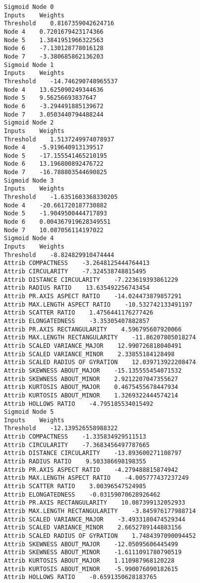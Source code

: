 \documentclass[
	article,			%
	11pt,				%
	oneside,			%
	a4paper,			%
	english,			%
	brazil,				%
	sumario=tradicional
	]{abntex2}
\begin{document}
\begin{lstlisting}
Sigmoid Node 0
Inputs    Weights
Threshold    0.8167359042624716
Node 4    0.7201679423174366
Node 5    1.3841951966322563
Node 6    -7.130128778016128
Node 7    -3.380685862136203
Sigmoid Node 1
Inputs    Weights
Threshold    -14.746290748965537
Node 4    13.625090249344636
Node 5    9.56256693837647
Node 6    -3.294491885139672
Node 7    3.0503440794488244
Sigmoid Node 2
Inputs    Weights
Threshold    1.5137249974078937
Node 4    -5.919640913139517
Node 5    -17.155541465210195
Node 6    13.196800892476722
Node 7    -16.788803544690825
Sigmoid Node 3
Inputs    Weights
Threshold    -1.6351603368330205
Node 4    -20.661720187730882
Node 5    -1.9049500444717893
Node 6    0.004367919628349551
Node 7    10.087056114197022
Sigmoid Node 4
Inputs    Weights
Threshold    -8.824829910474444
Attrib COMPACTNESS    -3.2648125444764413
Attrib CIRCULARITY    -7.324538748815495
Attrib DISTANCE CIRCULARITY    -7.223619393861229
Attrib RADIUS RATIO    13.635492256743454
Attrib PR.AXIS ASPECT RATIO    -14.024473879857291
Attrib MAX.LENGTH ASPECT RATIO    -10.532742133491197
Attrib SCATTER RATIO    1.4756441176277426
Attrib ELONGATEDNESS    -3.35305407882857
Attrib PR.AXIS RECTANGULARITY    4.596795607920066
Attrib MAX.LENGTH RECTANGULARITY    -11.86207805018274
Attrib SCALED VARIANCE_MAJOR    12.990726818040491
Attrib SCALED VARIANCE_MINOR    2.33855184128498
Attrib SCALED RADIUS OF GYRATION    12.039713922208474
Attrib SKEWNESS ABOUT_MAJOR    -15.135555454071532
Attrib SKEWNESS ABOUT_MINOR    2.9212207047355627
Attrib KURTOSIS ABOUT_MAJOR    0.4675455678447934
Attrib KURTOSIS ABOUT_MINOR    1.3269322444574214
Attrib HOLLOWS RATIO    -4.795185534015492
Sigmoid Node 5
Inputs    Weights
Threshold    -12.139526558988322
Attrib COMPACTNESS    -1.335834929511513
Attrib CIRCULARITY    -7.3683456497787665
Attrib DISTANCE CIRCULARITY    -13.893600271108797
Attrib RADIUS RATIO    9.503386698198355
Attrib PR.AXIS ASPECT RATIO    -4.279488815874942
Attrib MAX.LENGTH ASPECT RATIO    -4.005777437237249
Attrib SCATTER RATIO    3.00396547524985
Attrib ELONGATEDNESS    -0.03159070628926462
Attrib PR.AXIS RECTANGULARITY    10.087399132052933
Attrib MAX.LENGTH RECTANGULARITY    -3.845976177988714
Attrib SCALED VARIANCE_MAJOR    -3.4933180474529344
Attrib SCALED VARIANCE_MINOR    2.6652789144883156
Attrib SCALED RADIUS OF GYRATION    1.7484397090094452
Attrib SKEWNESS ABOUT_MAJOR    -12.05095606445499
Attrib SKEWNESS ABOUT_MINOR    -1.6111091780790519
Attrib KURTOSIS ABOUT_MAJOR    1.110987968120228
Attrib KURTOSIS ABOUT_MINOR    -5.990076090182615
Attrib HOLLOWS RATIO    -0.6591350628183765

\end{lstlisting}
\end{document}
